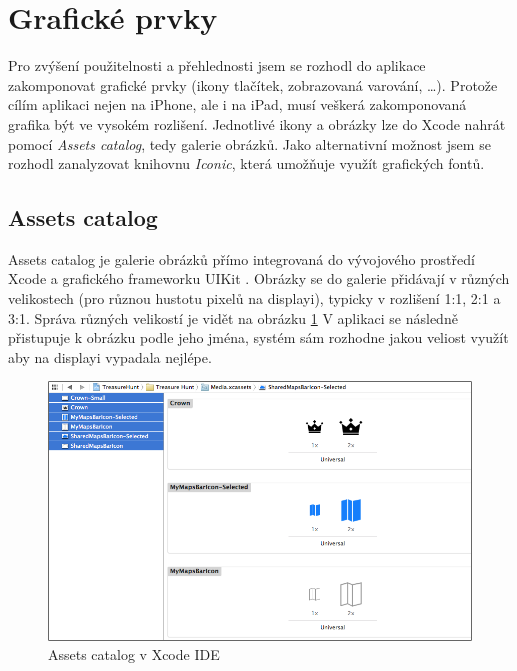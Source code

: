 \section{Grafické prvky}\label{analyza-graficke-prvky}

Pro zvýšení použitelnosti a přehlednosti jsem se rozhodl do aplikace zakomponovat grafické prvky (ikony tlačítek, zobrazovaná varování, \ldots).
Protože cílím aplikaci nejen na iPhone, ale i na iPad, musí veškerá zakomponovaná grafika být ve vysokém rozlišení.
Jednotlivé ikony a obrázky lze do Xcode nahrát pomocí \textit{Assets catalog}, tedy galerie obrázků.
Jako alternativní možnost jsem se rozhodl zanalyzovat knihovnu \textit{Iconic}, která umožňuje využít grafických fontů.

\subsection{Assets catalog}

Assets catalog je galerie obrázků přímo integrovaná do vývojového prostředí Xcode a grafického frameworku UIKit \cite{apple-xcode-assets-catalog}.
Obrázky se do galerie přidávají v různých velikostech (pro různou hustotu pixelů na displayi), typicky v rozlišení 1:1, 2:1 a 3:1.
Správa různých velikostí je vidět na obrázku \ref{fig:xcode-assets-catalog}
V aplikaci se následně přistupuje k obrázku podle jeho jména, systém sám rozhodne jakou veliost využít aby na displayi vypadala nejlépe.

\begin{figure}\centering
	\includegraphics[width=\textwidth]{assets/analysis-graphics-assets-catalog.png}
	\caption{Assets catalog v Xcode IDE \cite{rw-update-app-for-ios7}}\label{fig:xcode-assets-catalog}
\end{figure}

